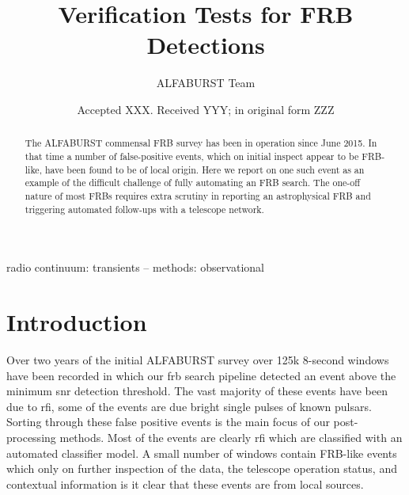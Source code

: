 \documentclass[a4paper,fleqn,usenatbib]{mnras}
\title[Verification Tests for FRB Detections]{Verification Tests for FRB
Detections}
\author[ALFABURST Team]{
ALFABURST Team
}
\date{Accepted XXX. Received YYY; in original form ZZZ}
\begin{document}
\label{firstpage}
\pagerange{\pageref{firstpage}--\pageref{lastpage}}
\maketitle

\begin{abstract}
The ALFABURST commensal FRB survey has been in operation since June 2015. In
that time a number of false-positive events, which on initial inspect appear to
be FRB-like, have been found to be of local origin. Here we report on one such event
as an example of the difficult challenge of fully automating an FRB search. The
one-off nature of most FRBs requires extra scrutiny in reporting an
astrophysical FRB and triggering automated follow-ups with a telescope network.
\end{abstract}

\begin{keywords}
radio continuum: transients -- methods: observational
\end{keywords}



\section{Introduction}
\label{sec:intro}

Over two years of the initial ALFABURST survey over 125k 8-second windows have
been recorded in which our \gls{frb} search pipeline detected an event above the
minimum \gls{snr} detection threshold. The vast majority of these events have been
due to \gls{rfi}, some of the events are due bright single pulses of known
pulsars. Sorting through these false positive events is the main focus of our
post-processing methods. Most of the events are clearly \gls{rfi} which are
classified with an automated classifier model. A small number of windows contain
FRB-like events which only on further inspection of the data, the telescope
operation status, and contextual information is it clear that these events are
from local sources.
\end{document}
